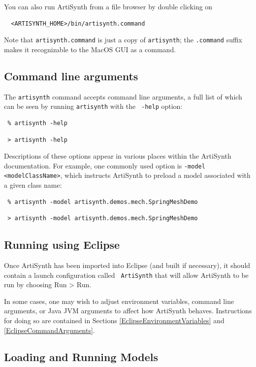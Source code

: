 You can also run ArtiSynth from a file browser by double clicking on
\begin{verbatim}
  <ARTISYNTH_HOME>/bin/artisynth.command
\end{verbatim}
Note that {\tt artisynth.command} is just a copy of {\tt artisynth};
the {\tt .command} suffix makes it recognizable to the MacOS GUI as a
command.
\fi\fi

\subsection{Command line arguments}
\label{CommandLineArguments}

The {\tt artisynth} command accepts command line arguments, a full
list of which can be seen by running {\tt artisynth} with the {\tt
-help} option:
\ifWindows
\begin{verbatim}
 % artisynth -help
\end{verbatim}
\else
\begin{verbatim}
 > artisynth -help
\end{verbatim}
\fi
Descriptions of these options appear in various places within the
ArtiSynth documentation. For example, one commonly used option is
{\tt -model <modelClassName>}, which instructs ArtiSynth to preload a
model associated with a given class name:
\ifWindows
\begin{verbatim}
 % artisynth -model artisynth.demos.mech.SpringMeshDemo
\end{verbatim}
\else
\begin{verbatim}
 > artisynth -model artisynth.demos.mech.SpringMeshDemo
\end{verbatim}
\fi

\subsection{Running using Eclipse}

Once ArtiSynth has been imported into Eclipse (and built if
necessary), it should contain a launch configuration called {\tt
ArtiSynth} that will allow ArtiSynth to be run by choosing {\sf Run >
Run}.

In some cases, one may wish to adjust environment variables, command
line arguments, or Java JVM arguments to affect how ArtiSynth behaves.
Instructions for doing so are contained in Sections
\ref{EclipseEnvironmentVariables} and \ref{EclipseCommandArguments}.

\subsection{Loading and Running Models}

